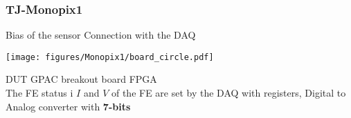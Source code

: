     \begin{frame}
        \frametitle{TJ-Monopix1}
            Bias of the sensor\hspace{80pt} Connection with the DAQ
            \begin{center}
                \centering \texttt{[image: figures/Monopix1/board\_circle.pdf]}
            \end{center}
            \hspace{15pt}DUT \hspace{45pt}GPAC breakout board \hspace{25pt} FPGA\\
            \bigskip
            The FE status i
            $I$ and $V$ of the FE are set by the DAQ with registers, Digital to Analog converter with \textbf{7-bits}
            \bigskip
    \end{frame} 
 







